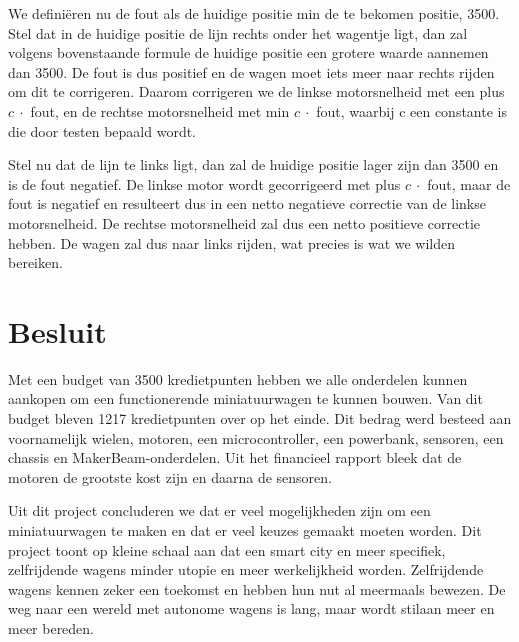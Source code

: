 \documentclass[a4paper,kulak]{kulakarticle}
\begin{document}
We definiëren nu de fout als de huidige positie min de te bekomen positie, 3500. Stel dat in de huidige positie de lijn rechts onder het wagentje ligt, dan zal volgens bovenstaande formule de huidige positie een grotere waarde aannemen dan 3500. De fout is dus positief en de wagen moet iets meer naar rechts rijden om dit te corrigeren. Daarom corrigeren we de linkse motorsnelheid met een plus $c \ \cdot$ fout, en de rechtse motorsnelheid met min $c \ \cdot$ fout, waarbij c een constante is die door testen bepaald wordt. 

Stel nu dat de lijn te links ligt, dan zal de huidige positie lager zijn dan 3500 en is de fout negatief. De linkse motor wordt gecorrigeerd met plus $c \  \cdot$ fout, maar de fout is negatief en resulteert dus in een netto negatieve correctie van de linkse motorsnelheid. De rechtse motorsnelheid zal dus een netto positieve correctie hebben. De wagen zal dus naar links rijden, wat precies is wat we wilden bereiken.


\section{Besluit}


Met een budget van 3500 kredietpunten hebben we alle onderdelen kunnen aankopen om een functionerende miniatuurwagen te kunnen bouwen. Van dit budget bleven 1217 kredietpunten over op het einde. Dit bedrag werd besteed aan voornamelijk wielen, motoren, een microcontroller, een powerbank, sensoren, een chassis en MakerBeam-onderdelen. Uit het financieel rapport bleek dat de motoren de grootste kost zijn en daarna de sensoren. 

Uit dit project concluderen we dat er veel mogelijkheden zijn om een miniatuurwagen te maken en dat er veel keuzes gemaakt moeten worden. Dit project toont op kleine schaal aan dat een smart city en meer specifiek, zelfrijdende wagens minder utopie en meer werkelijkheid worden. Zelfrijdende wagens kennen zeker een toekomst en hebben hun nut al meermaals bewezen. De weg naar een wereld met autonome wagens is
lang, maar wordt stilaan meer en meer bereden.



\end{document}
